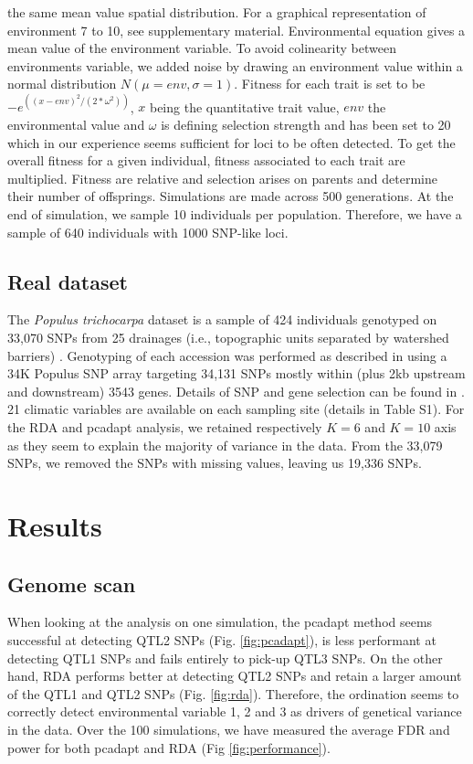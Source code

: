 \documentclass[nogrid]{MBE}%
\begin{document}
the same mean value spatial distribution. For a graphical representation of environment 7 to 10, see supplementary material. Environmental equation gives a mean value of the environment variable. To avoid colinearity between environments variable, we added noise by drawing an environment value within a normal distribution $N(\mu=env, \sigma=1)$. Fitness for each trait is set to be $-e^{((x-env)^2/(2*\omega^2))}$, $x$ being the quantitative trait value, $env$ the environmental value and $\omega$ is defining selection strength and has been set to 20 which in our experience seems sufficient for loci to be often detected. To get the overall fitness for a given individual, fitness associated to each trait are multiplied. Fitness are relative and selection arises on parents and determine their number of offsprings. Simulations are made across 500 generations. At the end of simulation, we sample 10 individuals per population. Therefore, we have a sample of 640 individuals with 1000 SNP-like loci.

\subsection{Real dataset}

The \textit{Populus trichocarpa} dataset is a sample of 424 individuals genotyped on 33,070 SNPs from 25 drainages (i.e., topographic units separated by watershed barriers) \citep{Geraldes2014}. Genotyping of each accession was performed as described in \citep{Geraldes2013} using a 34K Populus SNP array targeting 34,131 SNPs mostly within (plus 2kb upstream and downstream) 3543 genes. Details of SNP and gene selection can be found in \citep{Geraldes2013}. 21 climatic variables are available on each sampling site (details in Table S1). For the RDA and pcadapt analysis, we retained respectively $K=6$ and $K=10$ axis as they seem to explain the majority of variance in the data. From the 33,079 SNPs, we removed the SNPs with missing values, leaving us 19,336 SNPs.

\section{Results}

\subsection{Genome scan}

When looking at the analysis on one simulation, the pcadapt method seems successful at detecting QTL2 SNPs (Fig. \ref{fig:pcadapt}), is less performant at detecting QTL1 SNPs and fails entirely to pick-up QTL3 SNPs. On the other hand, RDA performs better at detecting QTL2 SNPs and retain a larger amount of the QTL1 and QTL2 SNPs (Fig. \ref{fig:rda}). Therefore, the ordination seems to correctly detect environmental variable 1, 2 and 3 as drivers of genetical variance in the data. Over the 100 simulations, we have measured the average FDR and power for both pcadapt and RDA (Fig \ref{fig:performance}). 
\end{document}
